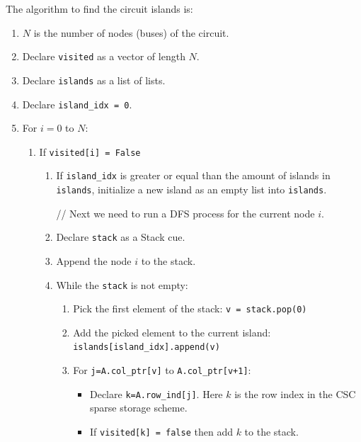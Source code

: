 \documentclass[nols,a4paper,twoside,symmetric,notoc,fleqn]{tufte-book}
\begin{document}

The algorithm to find the circuit islands is:

\begin{enumerate}
	\item $N$ is the number of nodes (buses) of the circuit.
	\item Declare \verb|visited| as a vector of length $N$.
	\item Declare \verb|islands| as a list of lists.
	\item Declare \verb|island_idx = 0|.
	\item For $i=0$ to $N$:
	
	\begin{enumerate}
		\item If \verb|visited[i] = False|
		
		\begin{enumerate}
			\item If \verb|island_idx| is greater or equal than the amount of islands in \verb|islands|, initialize a new island as an empty list into \verb|islands|.
			
			// Next we need to run a DFS process for the current node $i$.
			
			\item Declare \verb|stack| as a Stack cue.
			\item Append the node $i$ to the stack.
			
			\item While the \verb|stack| is not empty:
			
			\begin{enumerate}
				\item Pick the first element of the stack: \verb|v = stack.pop(0)|
				
				\item Add the picked element to the current island: \verb|islands[island_idx].append(v)|
				
				\item For \verb|j=A.col_ptr[v]| to \verb|A.col_ptr[v+1]|:
				
				\begin{itemize}
					\item Declare \verb|k=A.row_ind[j]|. Here $k$ is the row index in the CSC sparse storage scheme.
					
					\item If \verb|visited[k] = false| then add $k$ to the stack.
				\end{itemize}
				

\end{enumerate}
\end{enumerate}
\end{enumerate}
\end{enumerate}
\end{document}
